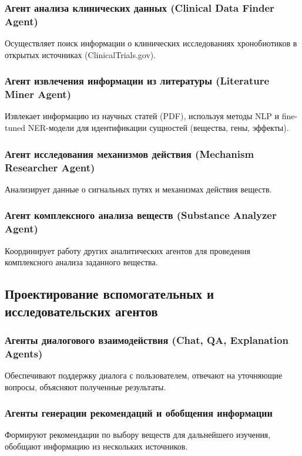 \documentclass[a4paper,14pt]{extarticle}
\begin{document}
	\subsubsection{Агент анализа клинических данных (Clinical Data Finder Agent)}
	Осуществляет поиск информации о клинических исследованиях хронобиотиков в открытых источниках (ClinicalTrials.gov).
	
	\subsubsection{Агент извлечения информации из литературы (Literature Miner Agent)}
	Извлекает информацию из научных статей (PDF), используя методы NLP и fine-tuned NER-модели для идентификации сущностей (вещества, гены, эффекты).
	
	\subsubsection{Агент исследования механизмов действия (Mechanism Researcher Agent)}
	Анализирует данные о сигнальных путях и механизмах действия веществ.
	
	\subsubsection{Агент комплексного анализа веществ (Substance Analyzer Agent)}
	Координирует работу других аналитических агентов для проведения комплексного анализа заданного вещества.
	
	\subsection{Проектирование вспомогательных и исследовательских агентов}
	
	\subsubsection{Агенты диалогового взаимодействия (Chat, QA, Explanation Agents)}
	Обеспечивают поддержку диалога с пользователем, отвечают на уточняющие вопросы, объясняют полученные результаты.
	
	\subsubsection{Агенты генерации рекомендаций и обобщения информации}
	Формируют рекомендации по выбору веществ для дальнейшего изучения, обобщают информацию из нескольких источников.
	
\end{document}
